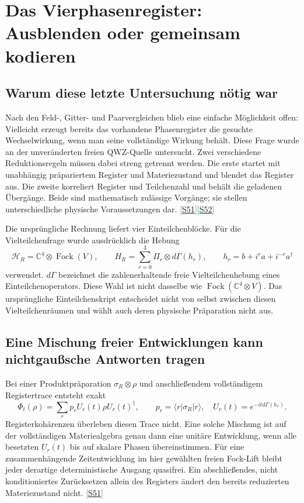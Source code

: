 \documentclass[11pt,a4paper,oneside,parskip=half,headings=normal,numbers=noenddot,bibliography=totoc]{scrreprt}
\newcommand{\C}{\mathbb C}
\newcommand{\ket}[1]{\lvert #1\rangle}
\newcommand{\bra}[1]{\langle #1\rvert}
\newcommand{\src}[1]{\textcolor{teal}{\small[\hyperref[s:#1]{S#1}]}}
\begin{document}
\chapter{Das Vierphasenregister: Ausblenden oder gemeinsam kodieren}
\label{ch:register}
\section{Warum diese letzte Untersuchung nötig war}
Nach den Feld-, Gitter- und Paarvergleichen blieb eine einfache Möglichkeit offen: Vielleicht erzeugt bereits das vorhandene Phasenregister die gesuchte Wechselwirkung, wenn man seine vollständige Wirkung behält. Diese Frage wurde an der unveränderten freien QWZ-Quelle untersucht. Zwei verschiedene Reduktionsregeln müssen dabei streng getrennt werden. Die erste startet mit unabhängig präpariertem Register und Materiezustand und blendet das Register aus. Die zweite korreliert Register und Teilchenzahl und behält die geladenen Übergänge. Beide sind mathematisch zulässige Vorgänge; sie stellen unterschiedliche physische Voraussetzungen dar. \src{51}\src{52}

Die ursprüngliche Rechnung liefert vier Einteilchenblöcke. Für die Vielteilchenfrage wurde ausdrücklich die Hebung
\[
 \mathcal H_R=\C^4\otimes\operatorname{Fock}(V),\qquad
 H_R=\sum_{r=0}^3\Pi_r\otimes d\Gamma(h_r),\qquad
 h_r=b+i^ra+i^{-r}a^\dagger
\]
verwendet. $d\Gamma$ bezeichnet die zahlenerhaltende freie Vielteilchenhebung eines Einteilchenoperators. Diese Wahl ist nicht dasselbe wie $\operatorname{Fock}(\C^4\otimes V)$. Das ursprüngliche Einteilchenskript entscheidet nicht von selbst zwischen diesen Vielteilchenräumen und wählt auch deren physische Präparation nicht aus.

\section{Eine Mischung freier Entwicklungen kann nichtgaußsche Antworten tragen}
Bei einer Produktpräparation $\sigma_R\otimes\rho$ und anschließendem vollständigem Registertrace entsteht exakt
\[
 \Phi_t(\rho)=\sum_r p_r U_r(t)\rho U_r(t)^\dagger,
 \qquad p_r=\bra r\sigma_R\ket r,
 \quad U_r(t)=e^{-itd\Gamma(h_r)}.
\]
Registerkohärenzen überleben diesen Trace nicht. Eine solche Mischung ist auf der vollständigen Materiealgebra genau dann eine unitäre Entwicklung, wenn alle besetzten $U_r(t)$ bis auf skalare Phasen übereinstimmen. Für eine zusammenhängende Zeitentwicklung im hier gewählten freien Fock-Lift bleibt jeder derartige deterministische Ausgang quasifrei. Ein abschließendes, nicht konditioniertes Zurücksetzen allein des Registers ändert den bereits reduzierten Materiezustand nicht. \src{51}
\end{document}
